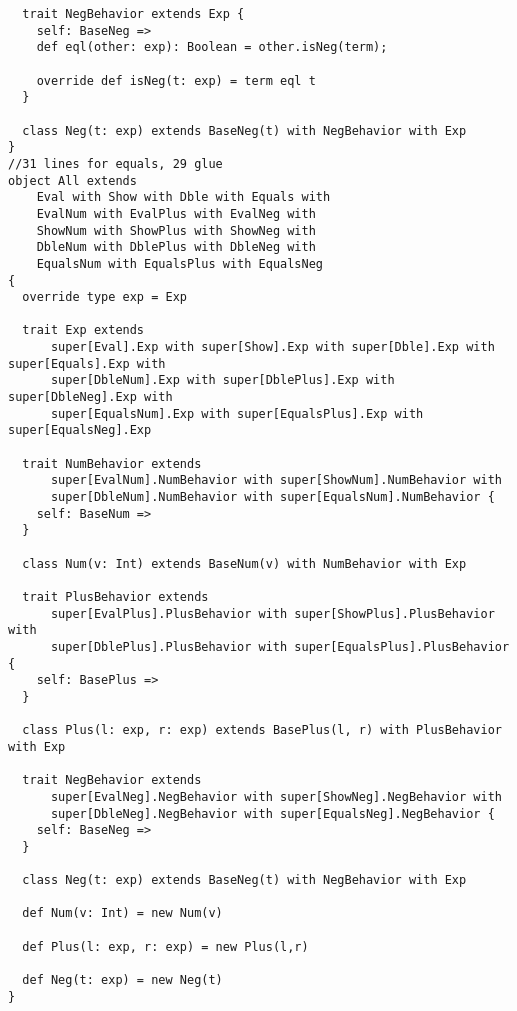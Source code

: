 \begin{lstlisting}
  trait NegBehavior extends Exp {
    self: BaseNeg =>
    def eql(other: exp): Boolean = other.isNeg(term);

    override def isNeg(t: exp) = term eql t
  }

  class Neg(t: exp) extends BaseNeg(t) with NegBehavior with Exp
}
//31 lines for equals, 29 glue
object All extends 
    Eval with Show with Dble with Equals with 
    EvalNum with EvalPlus with EvalNeg with 
    ShowNum with ShowPlus with ShowNeg with 
    DbleNum with DblePlus with DbleNeg with 
    EqualsNum with EqualsPlus with EqualsNeg 
{
  override type exp = Exp
  
  trait Exp extends 
      super[Eval].Exp with super[Show].Exp with super[Dble].Exp with super[Equals].Exp with
      super[DbleNum].Exp with super[DblePlus].Exp with super[DbleNeg].Exp with
      super[EqualsNum].Exp with super[EqualsPlus].Exp with super[EqualsNeg].Exp

  trait NumBehavior extends
      super[EvalNum].NumBehavior with super[ShowNum].NumBehavior with
      super[DbleNum].NumBehavior with super[EqualsNum].NumBehavior {
    self: BaseNum =>
  }

  class Num(v: Int) extends BaseNum(v) with NumBehavior with Exp

  trait PlusBehavior extends
      super[EvalPlus].PlusBehavior with super[ShowPlus].PlusBehavior with
      super[DblePlus].PlusBehavior with super[EqualsPlus].PlusBehavior {
    self: BasePlus =>
  }

  class Plus(l: exp, r: exp) extends BasePlus(l, r) with PlusBehavior with Exp

  trait NegBehavior extends
      super[EvalNeg].NegBehavior with super[ShowNeg].NegBehavior with
      super[DbleNeg].NegBehavior with super[EqualsNeg].NegBehavior {
    self: BaseNeg =>
  }

  class Neg(t: exp) extends BaseNeg(t) with NegBehavior with Exp
  
  def Num(v: Int) = new Num(v)
  
  def Plus(l: exp, r: exp) = new Plus(l,r)

  def Neg(t: exp) = new Neg(t)
}
\end{lstlisting}

